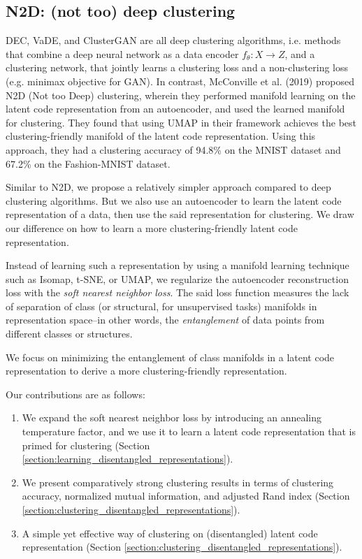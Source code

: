 \documentclass[conference]{IEEEtran}
\begin{document}
\subsection{N2D: (not too) deep clustering}
DEC\cite{xie2016unsupervised}, VaDE\cite{jiang2016variational}, and ClusterGAN\cite{mukherjee2019clustergan} are all deep clustering algorithms, i.e. methods that combine a deep neural network as a data encoder $f_{\theta}: X \rightarrow Z$, and a clustering network, that jointly learns a clustering loss and a non-clustering loss (e.g. minimax objective for GAN). In contrast, McConville et al. (2019)\cite{mcconville2019n2d} proposed N2D (Not too Deep) clustering, wherein they performed manifold learning on the latent code representation from an autoencoder, and used the learned manifold for clustering. They found that using UMAP in their framework achieves the best clustering-friendly manifold of the latent code representation. Using this approach, they had a clustering accuracy of 94.8\% on the MNIST dataset\cite{lecun1998gradient} and 67.2\% on the Fashion-MNIST dataset\cite{xiao2017fashion}.

Similar to N2D\cite{mcconville2019n2d}, we propose a relatively simpler approach compared to deep clustering algorithms. But we also use an autoencoder to learn the latent code representation of a data, then use the said representation for clustering. We draw our difference on how to learn a more clustering-friendly latent code representation.

Instead of learning such a representation by using a manifold learning technique such as Isomap\cite{tenenbaum2000global}, t-SNE\cite{maaten2008visualizing}, or UMAP\cite{mcinnes2018umap}, we regularize the autoencoder reconstruction loss with the \textit{soft nearest neighbor loss}\cite{salakhutdinov2007learning, frosst2019analyzing}. The said loss function measures the lack of separation of class (or structural, for unsupervised tasks) manifolds in representation space--in other words, the \textit{entanglement} of data points from different classes or structures.

We focus on minimizing the entanglement of class manifolds in a latent code representation to derive a more clustering-friendly representation.

Our contributions are as follows:
\begin{enumerate}
    \item We expand the soft nearest neighbor loss by introducing an annealing temperature factor, and we use it to learn a latent code representation that is primed for clustering (Section \ref{section:learning_disentangled_representations}).
    \item We present comparatively strong clustering results in terms of clustering accuracy, normalized mutual information, and adjusted Rand index (Section \ref{section:clustering_disentangled_representations}).
    \item A simple yet effective way of clustering on (disentangled) latent code representation (Section \ref{section:clustering_disentangled_representations}).
\end{enumerate}
\end{document}
